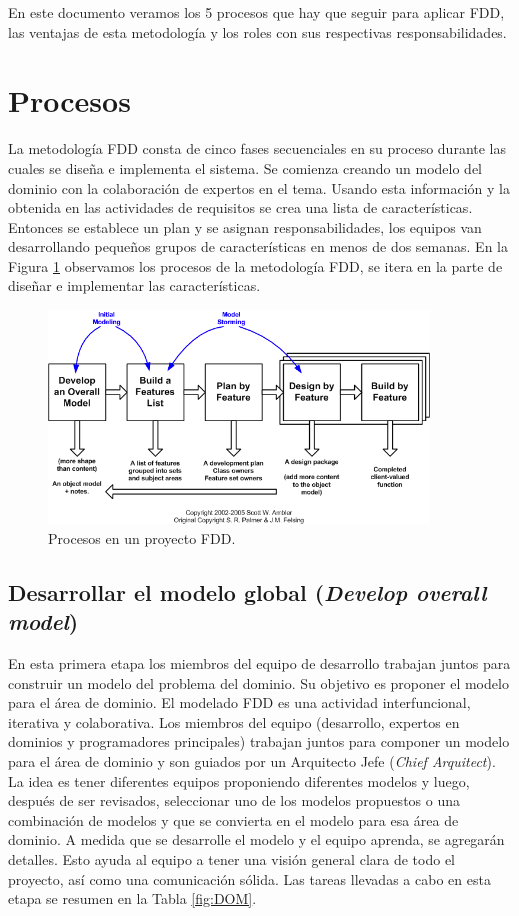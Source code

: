 \documentclass[11pt]{article}
\begin{document}
En este documento veramos los 5 procesos que hay que seguir para aplicar FDD, las ventajas de esta metodología y los roles con sus respectivas responsabilidades.

\section{Procesos}

La metodología FDD consta de cinco fases secuenciales en su proceso durante las cuales se diseña e implementa el sistema. Se comienza creando un modelo del dominio con la colaboración de expertos en el tema. Usando esta información y la obtenida en las actividades de requisitos se crea una lista de características. Entonces se establece un plan y se asignan responsabilidades, los equipos van desarrollando pequeños grupos de características en menos de dos semanas. En la Figura \ref{fig:proc} observamos los procesos de la metodología FDD, se itera en la parte de diseñar e implementar las características.

\begin{figure}[H]
    \centering
    \includegraphics[width=0.9\textwidth]{lifecycle}
    \caption{Procesos en un proyecto FDD.}
    \label{fig:proc}
\end{figure}

\subsection{Desarrollar el modelo global (\textit{Develop overall model})}
En esta primera etapa los miembros del equipo de desarrollo trabajan juntos para construir un modelo del problema del dominio. Su objetivo es proponer el modelo para el área de dominio. El modelado FDD es una actividad interfuncional, iterativa y colaborativa. Los miembros del equipo (desarrollo, expertos en dominios y programadores principales) trabajan juntos para componer un modelo para el área de dominio y son guiados por un Arquitecto Jefe (\textit{Chief Arquitect}). La idea es tener diferentes equipos proponiendo diferentes modelos y luego, después de ser revisados, seleccionar uno de los modelos propuestos o una combinación de modelos y que se convierta en el modelo para esa área de dominio. A medida que se desarrolle el modelo y el equipo aprenda, se agregarán detalles. Esto ayuda al equipo a tener una visión general clara de todo el proyecto, así como una comunicación sólida. Las tareas llevadas a cabo en esta etapa se resumen en la Tabla \ref{fig:DOM}. 
\end{document}

